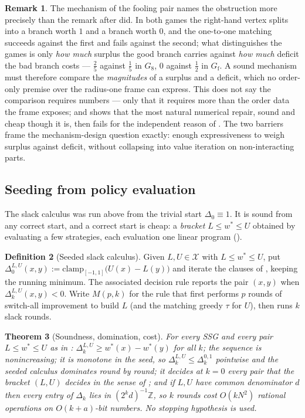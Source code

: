 \documentclass[11pt]{article}
\theoremstyle{plain}
\newtheorem{theorem}{Theorem}[section]
\theoremstyle{definition}
\newtheorem{definition}[theorem]{Definition}
\newtheorem{remark}[theorem]{Remark}
\begin{document}
\begin{remark}\label{rem:magnitude}
The mechanism of the fooling pair names the obstruction more precisely
than the remark after  did. In both games the
right-hand vertex splits into a branch worth $1$ and a branch worth $0$,
and the one-to-one matching succeeds against the first and fails against
the second; what distinguishes the games is only \emph{how much} surplus
the good branch carries against \emph{how much} deficit the bad branch
costs --- $\tfrac25$ against $\tfrac15$ in $G_8$, $0$ against $\tfrac12$
in $G_{\mathrm{f}}$. A sound mechanism must therefore compare the
\emph{magnitudes} of a surplus and a deficit, which no order-only
premise over the radius-one frame can express. This does not say the
comparison requires numbers --- only that it requires more than the
order data the frame exposes; and  shows that the most
natural numerical repair, sound and cheap though it is, then fails for
the independent reason of . The two barriers
frame the mechanism-design question exactly: enough expressiveness to
weigh surplus against deficit, without collapsing into value iteration
on non-interacting parts.
\end{remark}

\subsection{Seeding from policy evaluation}\label{sec:seeded}

The slack calculus was run above from the trivial start $\Delta_0\equiv1$.
It is sound from any correct start, and a correct start is cheap: a
\emph{bracket} $L\le w^\ast\le U$ obtained by evaluating a few strategies,
each evaluation one linear program ().

\begin{definition}[Seeded slack calculus]\label{def:seeded}
Given $L,U\in\mathcal{X}$ with $L\le w^\ast\le U$, put
$\Delta^{L,U}_0(x,y):=\mathrm{clamp}_{[-1,1]}\bigl(U(x)-L(y)\bigr)$ and
iterate the clauses of , keeping the running minimum. The
associated decision rule reports the pair $(x,y)$ when
$\Delta^{L,U}_k(x,y)<0$. Write $M(p,k)$ for the rule that first performs
$p$ rounds of switch-all improvement to build $L$ (and the matching
greedy $\tau$ for $U$), then runs $k$ slack rounds.
\end{definition}

\begin{theorem}[Soundness, domination, cost]\label{thm:seeded-sound}
For every SSG and every pair $L\le w^\ast\le U$ as in
: $\Delta^{L,U}_k\ge
w^\ast(x)-w^\ast(y)$ for all $k$; the sequence is nonincreasing; it is
monotone in the seed, so $\Delta^{L,U}_k\le\Delta^{0,1}_k$ pointwise and
the seeded calculus dominates  round by round; it decides
at $k=0$ every pair that the bracket $(L,U)$ decides in the sense of
; and if $L,U$ have common denominator $d$ then every
entry of $\Delta_k$ lies in $(2^kd)^{-1}\mathbb{Z}$, so $k$ rounds cost
$O(kN^{2})$ rational operations on $O(k+a)$-bit numbers. No stopping
hypothesis is used.
\end{theorem}
\end{document}
